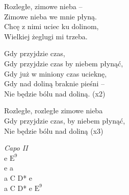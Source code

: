 \begin{text}
    \hfill\break
Rozległe, zimowe nieba –\\
Zimowe nieba we mnie płyną.\\
Chcę z nimi uciec ku dolinom,\\
Wielkiej żeglugi mi trzeba.

Gdy przyjdzie czas,\\
Gdy przyjdzie czas by niebem płynąć,\\
Gdy już w miniony czas ucieknę,\\
Gdy nad doliną braknie pieśni –\\
Nie będzie bólu nad doliną. (x2)

Rozległe, rozległe zimowe nieba\\
Gdy przyjdzie czas, by niebem płynąć,\\
Nie będzie bólu nad doliną (x3)
\end{text}
\begin{chord}
    \textit{Capo II}\\
    e $\mathrm{E^9}$\\
    e a\\
    a C D* e\\
    a C D* e $\mathrm{E^9}$
\end{chord}

